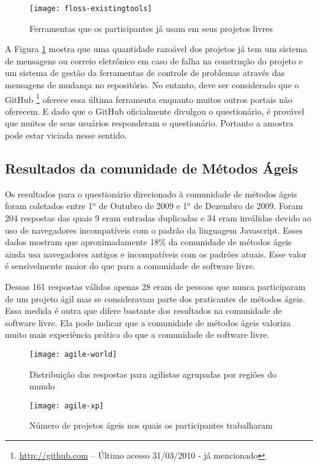\begin{figure}
  \centering
  \texttt{[image: floss-existingtools]}
  \caption{Ferramentas que os participantes já usam em seus projetos
    livres}
  \label{fig:floss-existingtools}
\end{figure}

A Figura \ref{fig:floss-existingtools} mostra que uma quantidade
razoável dos projetos já tem um sistema de mensagens ou correio
eletrônico em caso de falha na construção do projeto e um sistema de
gestão da ferramentas de controle de problemas através das mensagens
de mudança no repositório. No entanto, deve ser considerado que o
GitHub \footnote{\url{http://github.com} -- Último acesso 31/03/2010 - já
  mencionado} oferece essa última ferramenta enquanto muitos outros
portais não oferecem. E dado que o GitHub oficialmente divulgou o
questionário, é provável que muitos de seus usuários responderam o
questionário. Portanto a amostra pode estar viciada nesse sentido.

\subsection{Resultados da comunidade de Métodos Ágeis}
\label{sec:resp-agile}

Os resultados para o questionário direcionado à comunidade de métodos
ágeis foram coletados entre 1$^{\textrm{o}}$ de Outubro de 2009 e
1$^{\textrm{o}}$ de Dezembro de 2009. Foram 204 respostas das quais 9
eram entradas duplicadas e 34 eram inválidas devido ao uso de
navegadores incompatíveis com o padrão da linguagem Javascript. Esses
dados mostram que aproximadamente 18\% da comunidade de métodos ágeis
ainda usa navegadores antigos e incompatíveis com os padrões
atuais. Esse valor é sensivelmente maior do que para a comunidade de
software livre.

Dessas 161 respostas válidas apenas 28 eram de pessoas que nunca
participaram de um projeto ágil mas se consideravam parte dos
praticantes de métodos ágeis. Essa medida é outra que difere bastante
dos resultados na comunidade de software livre. Ela pode indicar que a
comunidade de métodos ágeis valoriza muito mais experiência prática do
que a comunidade de software livre.

\begin{figure}[htb]
  \begin{minipage}[t]{0.45\linewidth}
    \centering
    \texttt{[image: agile-world]}
    \caption{Distribuição das respostas para agilistas agrupadas por
      regiões do mundo}
    \label{fig:agile-world}
  \end{minipage}
  \begin{minipage}[t]{0.55\linewidth}
    \centering
    \texttt{[image: agile-xp]}
    \caption{Número de projetos ágeis nos quais os participantes
      trabalharam}
    \label{fig:agile-xp}
  \end{minipage}
\end{figure}

